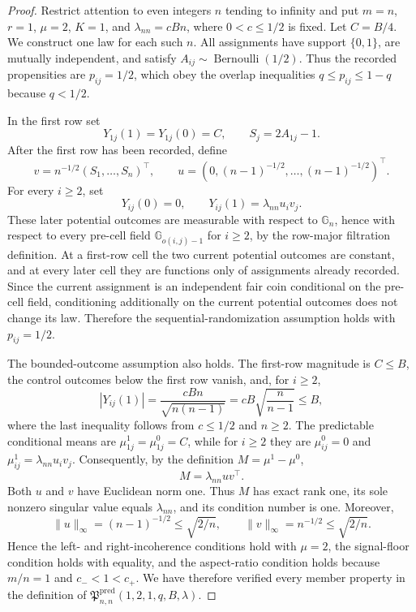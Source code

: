 \documentclass{article}
\begin{document}
\begin{proof}
Restrict attention to even integers \(n\) tending to infinity and put \(m=n\), \(r=1\), \(\mu=2\), \(K=1\), and \(\lambda_{nn}=cBn\), where \(0<c\le 1/2\) is fixed.  Let \(C=B/4\).  We construct one law for each such \(n\).  All assignments have support \(\{0,1\}\), are mutually independent, and satisfy \(A_{ij}\sim\operatorname{Bernoulli}(1/2)\).  Thus the recorded propensities are \(p_{ij}=1/2\), which obey the overlap inequalities \(q\le p_{ij}\le1-q\) because \(q<1/2\).

In the first row set
\[
Y_{1j}(1)=Y_{1j}(0)=C,
\qquad
S_j=2A_{1j}-1.
\]
After the first row has been recorded, define
\[
v=n^{-1/2}(S_1,\ldots,S_n)^\top,
\qquad
u=(0,(n-1)^{-1/2},\ldots,(n-1)^{-1/2})^\top.
\]
For every \(i\ge2\), set
\[
Y_{ij}(0)=0,
\qquad
Y_{ij}(1)=\lambda_{nn}u_iv_j.
\]
These later potential outcomes are measurable with respect to \(\mathbb G_n\), hence with respect to every pre-cell field \(\mathbb G_{o(i,j)-1}\) for \(i\ge2\), by the row-major filtration definition.  At a first-row cell the two current potential outcomes are constant, and at every later cell they are functions only of assignments already recorded.  Since the current assignment is an independent fair coin conditional on the pre-cell field, conditioning additionally on the current potential outcomes does not change its law.  Therefore the sequential-randomization assumption holds with \(p_{ij}=1/2\).

The bounded-outcome assumption also holds.  The first-row magnitude is \(C\le B\), the control outcomes below the first row vanish, and, for \(i\ge2\),
\[
|Y_{ij}(1)|
=\frac{cBn}{\sqrt{n(n-1)}}
=cB\sqrt{\frac n{n-1}}
\le B,
\]
where the last inequality follows from \(c\le1/2\) and \(n\ge2\).  The predictable conditional means are \(\mu^1_{1j}=\mu^0_{1j}=C\), while for \(i\ge2\) they are \(\mu^0_{ij}=0\) and \(\mu^1_{ij}=\lambda_{nn}u_iv_j\).  Consequently, by the definition \(M=\mu^1-\mu^0\),
\[
M=\lambda_{nn}uv^\top.
\]
Both \(u\) and \(v\) have Euclidean norm one.  Thus \(M\) has exact rank one, its sole nonzero singular value equals \(\lambda_{nn}\), and its condition number is one.  Moreover,
\[
\lVert u\rVert_\infty=(n-1)^{-1/2}\le\sqrt{2/n},
\qquad
\lVert v\rVert_\infty=n^{-1/2}\le\sqrt{2/n}.
\]
Hence the left- and right-incoherence conditions hold with \(\mu=2\), the signal-floor condition holds with equality, and the aspect-ratio condition holds because \(m/n=1\) and \(c_-<1<c_+\).  We have therefore verified every member property in the definition of \(\mathfrak P^{\mathrm{pred}}_{n,n}(1,2,1,q,B,\lambda)\).


\end{proof}
\end{document}
